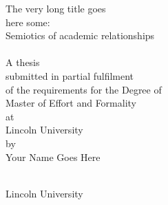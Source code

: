 
\hypertarget{TitlePage}{}


\begin{spacing}{1}
\begin{titlepage}
\begin{center}
\vspace*{9pt}
{\Medium\huge The very long title goes\\\smallskip here some:\\\bigskip Semiotics of academic relationships\\[1.7cm] }
\marule[0pt][0pt][black] \\[1.1cm]
{\LARGE A thesis \\\smallskip submitted in partial fulfilment\\\smallskip of the requirements for the Degree of\\}
\medskip
{\LARGE Master of Effort and Formality\\
\vspace{37pt}
at\\
\vspace{17pt}
Lincoln University\\
\vspace{17pt}
by\\
\vspace{37pt}
\LARGE Your Name Goes Here\\[1.1cm]}

\marule[0pt][0pt][black] \\[1.7cm]

{\Medium\LARGE Lincoln University\\}
\vfill

\end{center}
\end{titlepage}
\end{spacing}



\begin{spacing}{1}
\section*{\vspace{-33pt}\normalfont\Large{}}
\end{spacing}
{}

